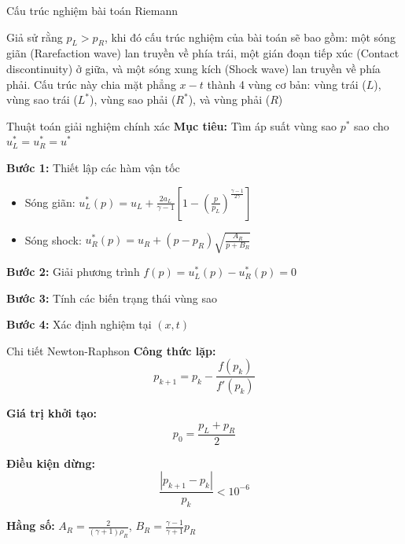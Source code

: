 \documentclass[aspectratio=43,10pt]{beamer}
\renewenvironment{figure}[1][]{}{}
\renewcommand{\caption}[1]{}
\renewcommand{\label}[1]{}
\begin{document}
\begin{frame}{Cấu trúc nghiệm bài toán Riemann}

Giả sử rằng $p_L > p_R$, khi đó cấu trúc nghiệm của bài toán sẽ bao gồm: một sóng giãn (Rarefaction wave) lan truyền về phía trái, một gián đoạn tiếp xúc (Contact discontinuity) ở giữa, và một sóng xung kích (Shock wave) lan truyền về phía phải. Cấu trúc này chia mặt phẳng $x-t$ thành 4 vùng cơ bản: vùng trái ($L$), vùng sao trái ($L^*$), vùng sao phải ($R^*$), và vùng phải ($R$)

\begin{center}
\begin{figure}[H]
\centering

\caption{Cấu trúc nghiệm bài toán Riemann trong mặt phẳng $x-t$ với $p_L > p_R$}
\label{fig:riemann_structure}
\end{figure}
\end{center}
\end{frame}

\begin{frame}{Thuật toán giải nghiệm chính xác}
\textbf{Mục tiêu:} Tìm áp suất vùng sao $p^*$ sao cho $u_L^* = u_R^* = u^*$

\textbf{Bước 1:} Thiết lập các hàm vận tốc
\begin{itemize}
    \item Sóng giãn: $u_L^*(p) = u_L + \frac{2a_L}{\gamma-1}\left[ 1 - \left( \frac{p}{p_L} \right)^{\frac{\gamma-1}{2\gamma}} \right]$
    \item Sóng shock: $u_R^*(p) = u_R + (p - p_R) \sqrt{\frac{A_R}{p + B_R}}$
\end{itemize}

\textbf{Bước 2:} Giải phương trình $f(p) = u_L^*(p) - u_R^*(p) = 0$

\textbf{Bước 3:} Tính các biến trạng thái vùng sao

\textbf{Bước 4:} Xác định nghiệm tại $(x,t)$
\end{frame}

\begin{frame}{Chi tiết Newton-Raphson}
\textbf{Công thức lặp:}
$$p_{k+1} = p_k - \frac{f(p_k)}{f'(p_k)}$$

\textbf{Giá trị khởi tạo:}
$$p_0 = \frac{p_L + p_R}{2}$$

\textbf{Điều kiện dừng:}
$$\frac{|p_{k+1} - p_k|}{p_k} < 10^{-6}$$

\textbf{Hằng số:} $A_R = \frac{2}{(\gamma+1)\rho_R}$, $B_R = \frac{\gamma-1}{\gamma+1}p_R$
\end{frame}
\end{document}
